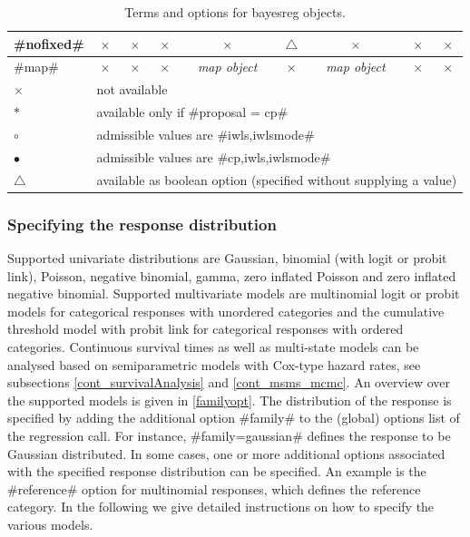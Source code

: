 \begin{table}
\begin{tabular}{|l||c|c|c|c|c|c|c|c|}
\hline
#nofixed#   & $\times$   & $\times$   & $\times$ & $\times$ & $\triangle$ & $\times$ & $\times$ & $\times$\\
\hline
#map#      & $\times$   & $\times$     & $\times$  & {\em map object}  & $\times$  & {\em map object} & $\times$ & $\times$ \\
\hline \hline
$\times$    & \multicolumn{8}{l|}{not available} \\
\hline
$\ast$  & \multicolumn{8}{l|}{available only if #proposal = cp#} \\
\hline
$\circ$  & \multicolumn{8}{l|}{admissible values are #iwls,iwlsmode#} \\
\hline
$\bullet$  & \multicolumn{8}{l|}{admissible values are #cp,iwls,iwlsmode#} \\
\hline
$\triangle$   & \multicolumn{8}{l|}{available as boolean option (specified without supplying a value)} \\
\hline

\end{tabular}
{\em\centering \caption{\label{termsoptions} Terms and options for
bayesreg objects.}}
\end{table}

\clearpage

\subsubsection{Specifying the response distribution} \label{familysyntax}

Supported univariate distributions are Gaussian, binomial (with
logit or probit link), Poisson, negative binomial, gamma, zero
inflated Poisson and zero inflated negative binomial. Supported
multivariate models are multinomial logit or probit models for
categorical responses with unordered categories and the cumulative
threshold model with probit link for categorical responses with
ordered categories. Continuous survival times as well as
multi-state models can be analysed based on semiparametric models
with Cox-type hazard rates, see subsections
\ref{cont_survivalAnalysis} and \ref{cont_msms_mcmc}. An overview
over the supported models is given in \autoref{familyopt}. The
distribution of the response is specified by adding the additional
option #family# to the (global) options list of the regression
call. For instance, #family=gaussian# defines the response to be
Gaussian distributed. In some cases, one or more additional
options associated with the specified response distribution can be
specified. An example is the #reference# option for multinomial
responses, which defines the reference category. In the following
we give detailed instructions on how to specify the various
models.

